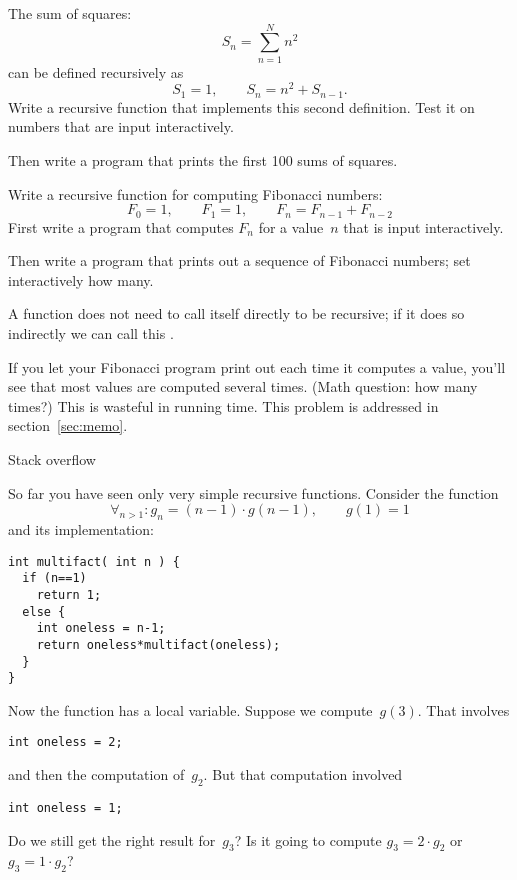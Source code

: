 \begin{exercise}
  \label{ex:recur-sum}
  The sum of squares:
  \[ S_n = \sum_{n=1}^N n^2 \]
  can be defined recursively as
  \[ S_1=1,\qquad S_n = n^2 + S_{n-1}. \]
  Write a recursive function that implements this second definition.
  Test it on numbers that are input interactively.

  Then write a program that prints the first 100 sums of squares.
\end{exercise}

\begin{exercise}
  \label{ex:recur-fib}
  Write a recursive function for computing Fibonacci numbers:
  \[ F_0=1,\qquad F_1=1,\qquad F_{n}=F_{n-1}+F_{n-2} \]
  First write a program that computes $F_n$ for a value~$n$ that is
  input interactively.

  Then write a program that prints out a sequence of Fibonacci
  numbers; set interactively how many.
\end{exercise}

\begin{remark}
  A function does not need to call itself directly to be recursive; if
  it does so indirectly we can call this .
\end{remark}

\begin{remark}
  If you let your Fibonacci program print out each time it computes a
  value, you'll see that most values are computed several times. (Math
  question: how many times?) This is wasteful in running time. This
  problem is addressed in section~\ref{sec:memo}.
\end{remark}

 {Stack overflow}

So far you have seen only very simple recursive functions. Consider
the function
\[ \forall_{n>1}\colon g_n = (n-1)\cdot g(n-1),\qquad g(1)=1 \]
and its implementation:
\begin{verbatim}
int multifact( int n ) {
  if (n==1)
    return 1;
  else {
    int oneless = n-1;
    return oneless*multifact(oneless);
  }
}
\end{verbatim}
Now the function has a local variable. Suppose we compute~$g(3)$. That
involves
\begin{verbatim}
int oneless = 2;
\end{verbatim}
and then the computation of~$g_2$. But that computation involved 
\begin{verbatim}
int oneless = 1;
\end{verbatim}
Do we still get the right result for~$g_3$? Is it going to compute
$g_3=2\cdot g_2$ or $g_3=1\cdot g_2$?

